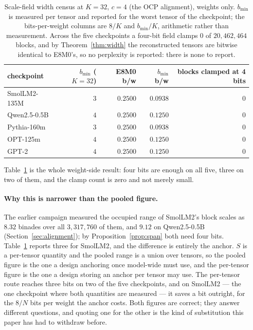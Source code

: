 \documentclass[11pt]{article}
\theoremstyle{definition}
\begin{document}
\begin{table}[t]\centering
\caption{Scale-field width census at $K=32$, $c=4$ (the OCP alignment), weights
only. $b_{\min}$ is measured per tensor and reported for the worst tensor of the
checkpoint; the bits-per-weight columns are $8/K$ and $b_{\min}/K$, arithmetic
rather than measurement. Across the five checkpoints a four-bit field clamps
$0$ of $20{,}462{,}464$ blocks, and by Theorem~\ref{thm:width} the reconstructed
tensors are bitwise identical to E8M0's, so no perplexity is reported: there is
none to report.}
\label{tab:census}
\begin{tabular}{lrrrr}
\toprule
checkpoint & $b_{\min}$ ($K{=}32$) & E8M0 b/w & $b_{\min}$ b/w & blocks clamped at 4 bits \\
\midrule
SmolLM2-135M & $3$ & $0.2500$ & $\mathbf{0.0938}$ & $0$ \\
Qwen2.5-0.5B & $4$ & $0.2500$ & $\mathbf{0.1250}$ & $0$ \\
Pythia-160m  & $3$ & $0.2500$ & $\mathbf{0.0938}$ & $0$ \\
OPT-125m     & $4$ & $0.2500$ & $\mathbf{0.1250}$ & $0$ \\
GPT-2        & $4$ & $0.2500$ & $\mathbf{0.1250}$ & $0$ \\
\bottomrule
\end{tabular}
\end{table}

Table~\ref{tab:census} is the whole weight-side result: four bits are enough on
all five, three on two of them, and the clamp count is zero and not merely small.

\paragraph{Why this is narrower than the pooled figure.} The earlier campaign
measured the occupied range of SmolLM2's block scales as $8.32$ binades over all
$3{,}317{,}760$ of them, and $9.12$ on Qwen2.5-0.5B
(Section~\ref{sec:alignment}); by Proposition~\ref{prop:span} both need four
bits. Table~\ref{tab:census} reports three for SmolLM2, and the difference is
entirely the anchor. $S$ is a per-tensor quantity and the pooled range is a
union over tensors, so the pooled figure is the one a design anchoring once
model-wide must use, and the per-tensor figure is the one a design storing an
anchor per tensor may use. The per-tensor route reaches three bits on two of the
five checkpoints, and on SmolLM2 --- the one checkpoint where both quantities
are measured --- it saves a bit outright, for the $8/N$ bits per weight the
anchor costs. Both figures are correct; they answer
different questions, and quoting one for the other is the kind of substitution
this paper has had to withdraw before.
\end{document}
